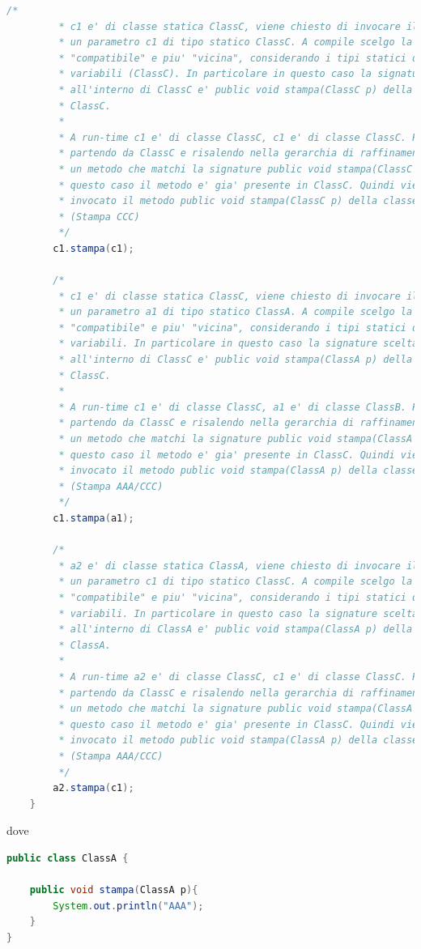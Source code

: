 \documentclass{article}
\begin{document}
\begin{lstlisting}[language=Java,escapechar=|]
		/*
		 * c1 e' di classe statica ClassC, viene chiesto di invocare il metodo stampa su
		 * un parametro c1 di tipo statico ClassC. A compile scelgo la signature
		 * "compatibile" e piu' "vicina", considerando i tipi statici delle
		 * variabili (ClassC). In particolare in questo caso la signature scelta
		 * all'interno di ClassC e' public void stampa(ClassC p) della classe
		 * ClassC.
		 * 
		 * A run-time c1 e' di classe ClassC, c1 e' di classe ClassC. Per questo
		 * partendo da ClassC e risalendo nella gerarchia di raffinamento cerco
		 * un metodo che matchi la signature public void stampa(ClassC p). In
		 * questo caso il metodo e' gia' presente in ClassC. Quindi viene
		 * invocato il metodo public void stampa(ClassC p) della classe ClassC
		 * (Stampa CCC)
		 */
		c1.stampa(c1);
		
		/*
		 * c1 e' di classe statica ClassC, viene chiesto di invocare il metodo stampa su
		 * un parametro a1 di tipo statico ClassA. A compile scelgo la signature
		 * "compatibile" e piu' "vicina", considerando i tipi statici delle
		 * variabili. In particolare in questo caso la signature scelta
		 * all'interno di ClassC e' public void stampa(ClassA p) della classe
		 * ClassC.
		 * 
		 * A run-time c1 e' di classe ClassC, a1 e' di classe ClassB. Per questo
		 * partendo da ClassC e risalendo nella gerarchia di raffinamento cerco
		 * un metodo che matchi la signature public void stampa(ClassA p). In
		 * questo caso il metodo e' gia' presente in ClassC. Quindi viene
		 * invocato il metodo public void stampa(ClassA p) della classe ClassC
		 * (Stampa AAA/CCC)
		 */
		c1.stampa(a1);

		/*
		 * a2 e' di classe statica ClassA, viene chiesto di invocare il metodo stampa su
		 * un parametro c1 di tipo statico ClassC. A compile scelgo la signature
		 * "compatibile" e piu' "vicina", considerando i tipi statici delle
		 * variabili. In particolare in questo caso la signature scelta
		 * all'interno di ClassA e' public void stampa(ClassA p) della classe
		 * ClassA.
		 * 
		 * A run-time a2 e' di classe ClassC, c1 e' di classe ClassC. Per questo
		 * partendo da ClassC e risalendo nella gerarchia di raffinamento cerco
		 * un metodo che matchi la signature public void stampa(ClassA p). In
		 * questo caso il metodo e' gia' presente in ClassC. Quindi viene
		 * invocato il metodo public void stampa(ClassA p) della classe ClassC
		 * (Stampa AAA/CCC)
		 */
		a2.stampa(c1);
	}
\end{lstlisting}
dove 
\begin{lstlisting}[language=Java,escapechar=|]
public class ClassA {

	public void stampa(ClassA p){
		System.out.println("AAA");
	}
}
\end{lstlisting}
\end{document}
